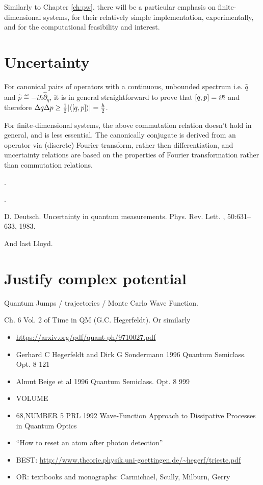 Similarly to Chapter \ref{ch:pw},
there will be a particular emphasis on finite-dimensional systems,
for their relatively simple implementation, experimentally,
and for the computational feasibility and interest.

\section{Uncertainty}

For canonical pairs of operators with a continuous, unbounded spectrum i.e.
$\hat{q}$ and $\hat{p} \eqdef -i\hbar\hat{\partial}_{q}$,
it is in general straightforward to prove that
$\qty[q, p] = i\hbar$ and therefore
$\Delta q \Delta p \geq {\frac{1}{2} \qty|\ev{\qty[q, p]}| = \frac{\hbar}{2}}$.

For finite-dimensional systems, the above commutation relation doesn't hold
in general, and is less essential.
The canonically conjugate is derived from an operator
via (discrete) Fourier transform, rather then differentiation,
and uncertainty relations are based on
the properties of Fourier transformation
rather than commutation relations.

\cite[\S 2.4]{FiniteHilb}.

\cite{Wehner:Uncertainty}.

D. Deutsch.  Uncertainty in quantum measurements.
Phys. Rev. Lett.
, 50:631–633, 1983.


And last Lloyd.

\section{Justify complex potential}

Quantum Jumps / trajectories / Monte Carlo Wave Function.

Ch. 6 Vol. 2 of Time in QM (G.C. Hegerfeldt). Or similarly
\begin{itemize}
  \item \url{https://arxiv.org/pdf/quant-ph/9710027.pdf}
  \item Gerhard C Hegerfeldt and Dirk G Sondermann 1996 Quantum Semiclass. Opt. 8 121
  \item  Almut Beige et al 1996 Quantum Semiclass. Opt. 8 999
  \item VOLUME
  \item 68,NUMBER 5 PRL 1992 Wave-Function Approach to Dissipative Processes in Quantum Optics
  \item ``How to reset an atom after photon detection'' 
  \item BEST: \url{http://www.theorie.physik.uni-goettingen.de/~hegerf/trieste.pdf}
  \item OR: textbooks and monographs: Carmichael, Scully, Milburn, Gerry
\end{itemize}


